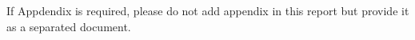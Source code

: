 \documentclass[a4paper, 10pt, conference]{ieeeconf}      %
\begin{document}
If Appdendix is required, please do not add appendix in this report but provide it as a separated document. 

%





\end{document}
